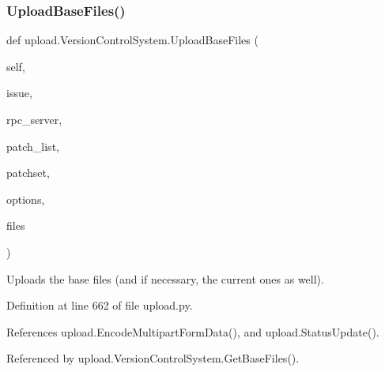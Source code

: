 \subsubsection{\texorpdfstring{Upload\+Base\+Files()}{UploadBaseFiles()}\hspace{0.1cm}{\footnotesize\ttfamily [2/2]}}
{\footnotesize\ttfamily def upload.\+Version\+Control\+System.\+Upload\+Base\+Files (\begin{DoxyParamCaption}\item[{}]{self,  }\item[{}]{issue,  }\item[{}]{rpc\+\_\+server,  }\item[{}]{patch\+\_\+list,  }\item[{}]{patchset,  }\item[{}]{options,  }\item[{}]{files }\end{DoxyParamCaption})}

\begin{DoxyVerb}Uploads the base files (and if necessary, the current ones as well).\end{DoxyVerb}
 

Definition at line 662 of file upload.\+py.



References upload.\+Encode\+Multipart\+Form\+Data(), and upload.\+Status\+Update().



Referenced by upload.\+Version\+Control\+System.\+Get\+Base\+Files().


